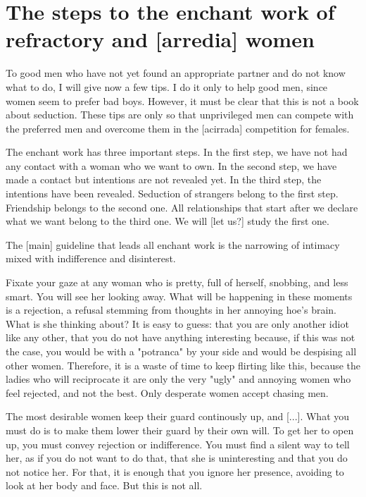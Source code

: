 \section{The steps to the enchant work of refractory and [arredia] women}

\par To good men who have not yet found an appropriate partner and do not know what to do, I will give now a few tips. I do it only to help good men, since women seem to prefer bad boys. However, it must be clear that this is not a book about seduction. These tips are only so that unprivileged men can compete with the preferred men and overcome them in the [acirrada] competition for females.

\par The enchant work has three important steps. In the first step, we have not had any contact with a woman who we want to own. In the second step, we have made a contact but intentions are not revealed yet. In the third step, the intentions have been revealed. Seduction of strangers belong to the first step. Friendship belongs to the second one. All relationships that start after we declare what we want belong to the third one. We will [let us?] study the first one.

\par The [main] guideline that leads all enchant work is the narrowing of intimacy mixed with indifference and disinterest.

\par Fixate your gaze at any woman who is pretty, full of herself, snobbing, and less smart. You will see her looking away.
What will be happening in these moments is a rejection, a refusal stemming from thoughts in her annoying hoe's brain. What is she thinking about?  It is easy to guess: that you are only another idiot like any other, that you do not have anything interesting because, if this was not the case, you would be with a "potranca" by your side and would be despising all other women.  Therefore, it is a waste of time to keep flirting like this, because the ladies who will reciprocate it are only the very "ugly" and annoying women who feel rejected, and not the best.  Only desperate women accept chasing men.
 
\par The most desirable women keep their guard continously up, and [...]. What you must do is to make them lower their guard by their own will. To get her to open up, you must convey rejection or indifference. You must find a silent way to tell her, as if you do not want to do that, that she is uninteresting and that you do not notice her. For that, it is enough that you ignore her presence, avoiding to look at her body and face. But this is not all.
 
